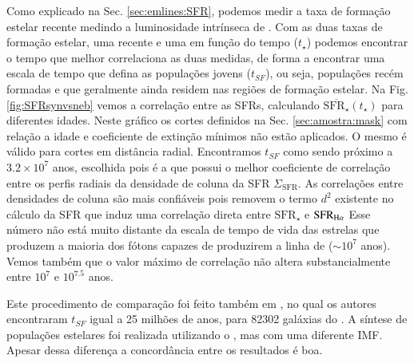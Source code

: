 Como explicado na Sec. \ref{sec:emlines:SFR}, podemos medir a taxa de formação estelar recente
medindo a luminosidade intrínseca de \Halpha. Com as duas taxas de formação estelar, uma recente e
uma em função do tempo ($t_\star$) podemos encontrar o tempo que melhor correlaciona as duas
medidas, de forma a encontrar uma escala de tempo que defina as populações jovens ($t_{SF}$), ou
seja, populações recém formadas e que geralmente ainda residem nas regiões de formação estelar. Na
Fig. \ref{fig:SFRsynvsneb} vemos a correlação entre as SFRs, calculando
$\overline{\mathrm{SFR}_\star}(t_\star)$ para diferentes idades. Neste gráfico os cortes definidos
na Sec. \ref{sec:amostra:mask} com relação a idade e coeficiente de extinção mínimos não estão
aplicados. O mesmo é válido para cortes em distância radial. Encontramos $t_{SF}$ como sendo próximo
a $3.2 \times 10^7$ anos, escolhida pois é a que possui o melhor coeficiente de correlação entre os
perfis radiais da densidade de coluna da SFR $\Sigma_{\mathrm{SFR}}$. As correlações entre
densidades de coluna são mais confiáveis pois removem o termo $d^2$ existente no cálculo da SFR que
induz uma correlação direta entre $\mathrm{SFR}_\star$ e $\mathrm{SFR}_{\Halpha}$ Esse número não
está muito distante da escala de tempo de vida das estrelas que produzem a maioria dos fótons
capazes de produzirem a linha de \Halpha ($\sim10^7$ anos). Vemos também que o valor máximo de
correlação não altera substancialmente entre $10^7$ e $10^{7.5}$ anos.

Este procedimento de comparação foi feito também em \citet{Asari.etal.2007a}, no qual os autores
encontraram $t_{SF}$ igual a 25 milhões de anos, para 82302 galáxias do \SDSS. A síntese de
populações estelares foi realizada utilizando o \starlight, mas com uma diferente IMF. Apesar dessa
diferença a concordância entre os resultados é boa.

